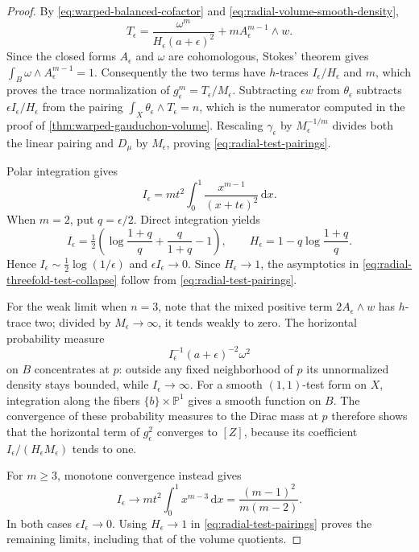 \begin{proof}
By \eqref{eq:warped-balanced-cofactor} and \eqref{eq:radial-volume-smooth-density},
\[
 T_\epsilon=\frac{\omega^m}{H_\epsilon(a+\epsilon)^2}
               +mA_\epsilon^{m-1}\wedge w.
\]
Since the closed forms $A_\epsilon$ and $\omega$ are cohomologous, Stokes' theorem gives
$\int_B\omega\wedge A_\epsilon^{m-1}=1$. Consequently the two terms have $h$-traces $I_\epsilon/H_\epsilon$ and $m$, which proves the trace normalization of $g_\epsilon^m=T_\epsilon/M_\epsilon$. Subtracting $\epsilon w$ from $\theta_\epsilon$ subtracts $\epsilon I_\epsilon/H_\epsilon$ from the pairing $\int_X\theta_\epsilon\wedge T_\epsilon=n$, which is the numerator computed in the proof of \cref{thm:warped-gauduchon-volume}. Rescaling $\gamma_\epsilon$ by $M_\epsilon^{-1/m}$ divides both the linear pairing and $D_\mu$ by $M_\epsilon$, proving \eqref{eq:radial-test-pairings}.

Polar integration gives
\[
 I_\epsilon=m t^2\int_0^1
              \frac{x^{m-1}}{(x+t\epsilon)^2}\,\mathrm{d}x.
\]
When $m=2$, put $q=\epsilon/2$. Direct integration yields
\[
 I_\epsilon=\tfrac12\left(\log\frac{1+q}{q}
                      +\frac q{1+q}-1\right),
 \qquad H_\epsilon=1-q\log\frac{1+q}{q}.
\]
Hence $I_\epsilon\sim\tfrac12\log(1/\epsilon)$ and $\epsilon I_\epsilon\to0$. Since $H_\epsilon\to1$, the asymptotics in \eqref{eq:radial-threefold-test-collapse} follow from \eqref{eq:radial-test-pairings}.

For the weak limit when $n=3$, note that the mixed positive term $2A_\epsilon\wedge w$ has $h$-trace two; divided by $M_\epsilon\to\infty$, it tends weakly to zero. The horizontal probability measure
\[
 I_\epsilon^{-1}(a+\epsilon)^{-2}\omega^2
\]
on $B$ concentrates at $p$: outside any fixed neighborhood of $p$ its unnormalized density stays bounded, while $I_\epsilon\to\infty$. For a smooth $(1,1)$-test form on $X$, integration along the fibers $\{b\}\times\mathbb P^1$ gives a smooth function on $B$. The convergence of these probability measures to the Dirac mass at $p$ therefore shows that the horizontal term of $g_\epsilon^2$ converges to $[Z]$, because its coefficient $I_\epsilon/(H_\epsilon M_\epsilon)$ tends to one.

For $m\geq3$, monotone convergence instead gives
\[
 I_\epsilon\longrightarrow m t^2\int_0^1x^{m-3}\,\mathrm{d}x
                =\frac{(m-1)^2}{m(m-2)}.
\]
In both cases $\epsilon I_\epsilon\to0$. Using $H_\epsilon\to1$ in \eqref{eq:radial-test-pairings} proves the remaining limits, including that of the volume quotients.
\end{proof}

